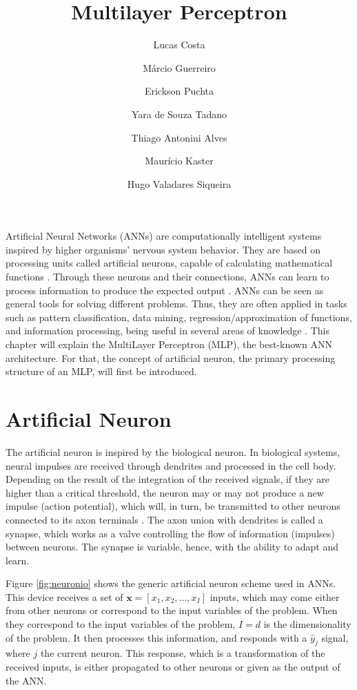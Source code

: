 \title{Multilayer Perceptron}
\label{chp:multilayer-perceptron}
\author{Lucas Costa \and Márcio Guerreiro \and Erickson Puchta \and Yara de Souza Tadano \and Thiago Antonini Alves \and  Maurício Kaster \and Hugo Valadares Siqueira}
\maketitle

Artificial Neural Networks (ANNs) are computationally intelligent systems inspired by higher organisms' nervous system behavior. They are based on processing units called artificial neurons, capable of calculating mathematical functions \cite{haykin}. Through these neurons and their connections, ANNs can learn to process information to produce the expected output \cite{Castro2006FundamentalsON}. ANNs can be seen as general tools for solving different problems. Thus, they are often applied in tasks such as pattern classification, data mining, regression/approximation of functions, and information processing, being useful in several areas of knowledge \cite{haykin}.
This chapter will explain the MultiLayer Perceptron (MLP), the best-known ANN architecture.  For that, the concept of artificial neuron, the primary processing structure of an MLP, will first be introduced.


\section{Artificial Neuron}
\label{sec:neuronio}

The artificial neuron is inspired by the biological neuron. In biological systems, neural impulses are received through dendrites and processed in the cell body. Depending on the result of the integration of the received signals, if they are higher than a critical threshold, the neuron may or may not produce a new impulse (action potential), which will, in turn, be transmitted to other neurons connected to its axon terminals \cite{Castro2006FundamentalsON}. The axon union with dendrites is called a synapse, which works as a valve controlling the flow of information (impulses) between neurons. The synapse is variable, hence, with the ability to adapt and learn.

Figure \ref{fig:neuronio} shows the generic artificial neuron scheme used in ANNs. This device receives a set of $\textbf{x} = [ x_1 , x_2 ,..., x_I]$ inputs, which may come either from other neurons or correspond to the input variables of the problem. When they correspond to the input variables of the problem, $I=d$ is the dimensionality of the problem. It then processes this information, and responds with a $\hat{y}_j$ signal, where $j$ the current neuron. This response, which is a transformation of the received inputs, is either propagated to other neurons or given as the output of the ANN.

